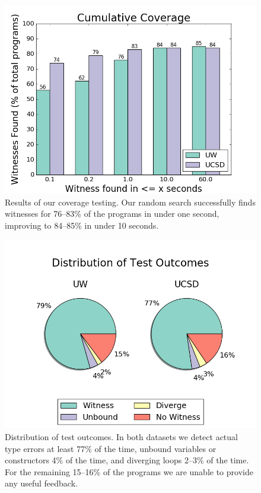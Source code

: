 \begin{figure}[t]
\centering
\includegraphics[width=0.7\linewidth]{nanomaly/coverage.png}
\caption{Results of our coverage testing. Our random search successfully
  finds witnesses for 76--83\% of the programs in under one second,
  improving to 84--85\% in under 10 seconds. }
\label{fig:results-witness}
\end{figure}
\begin{figure}[t]
\includegraphics[width=0.7\linewidth]{nanomaly/distrib.png}
\caption{Distribution of test outcomes. In both datasets we detect
  actual type errors at least 77\% of the time, unbound variables or
  constructors 4\% of the time, and diverging loops 2--3\% of the
  time. For the remaining 15--16\% of the programs we are unable to
  provide any useful feedback. }
\label{fig:results-distrib}
\end{figure}


